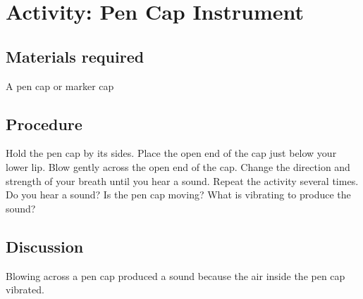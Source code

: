 \section{Activity: Pen Cap Instrument}
\subsection{Materials required}
A pen cap or marker cap
\subsection{Procedure}
Hold the pen cap by its sides. Place the open end of the cap just below your lower lip. Blow gently across the open end of the cap. Change the direction and strength of your breath until you hear a sound. Repeat the activity several times.
 Do you hear a sound? Is the pen cap moving? What is vibrating to produce the sound?
\begin{marginfigure}
  \caption{Illustration of a child blowing across the top of a pen cap}
\end{marginfigure}
\subsection{Discussion}
Blowing across a pen cap produced a sound because the air inside the pen cap vibrated.